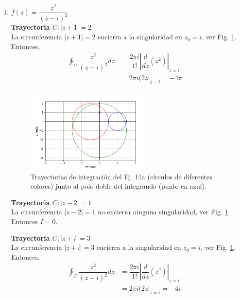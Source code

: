 \documentclass[10pt,a4paper]{article}
\begin{document}
\begin{enumerate}
\begin{enumerate}
\item $f(z)=\dfrac{z^2}{(z-i)^2}$ \\
\label{ej:sol11a}
\textbf{Trayectoria $C: |z+1|=2$}\\ 
La circunferencia $|z+1|=2$ encierra a la singularidad en $z_0=i$, ver Fig. \ref{fig:sol11a}. Entonces,
\begin{align}
\oint_C \dfrac{z^2}{(z-i)^{2}}dz&=\dfrac{2\pi i}{1!}\left| \dfrac{d}{dz}(z^2)\right|_{z=i}&\\
								&= 2\pi i (2z|_{z=i} = \boxed{-4\pi}
\end{align}
\begin{figure}[!htbp]
	\centering
	\includegraphics[width=0.6\textwidth]{tp3_11a.png}
	\caption{Trayectorias de integraci\'on del Ej. 11a (círculos de diferentes colores) 
		junto al polo doble del integrando (punto en azul).}
	\label{fig:sol11a}
\end{figure}

\textbf{Trayectoria $C: |z-2|=1$}\\ 
La circunferencia $|z-2|=1$ no encierra ninguna singularidad, ver Fig. \ref{fig:sol11a}. Entonces $ \boxed{I=0}$.

\textbf{Trayectoria $C: |z+i|=3$}\\ 
La circunferencia $|z+i|=3$ encierra a la singularidad en $z_0=i$, ver Fig. \ref{fig:sol11a}. Entonces,
\begin{align}
\oint_C \dfrac{z^2}{(z-i)^{2}}dz&=\dfrac{2\pi i}{1!}\left| \dfrac{d}{dz}(z^2)\right|_{z=i}&\\
								&= 2\pi i (2z|_{z=i} = \boxed{-4\pi}
\end{align}

\end{enumerate}
\end{enumerate}
\end{document}
